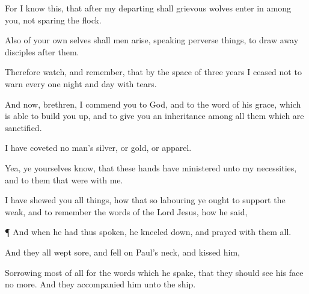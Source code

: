 {For
I
know
this,
that
after
my
departing shall
grievous
wolves
enter in
among
you,
not
sparing the
flock.

Also
of
your own
selves
shall
men
arise,
speaking perverse
things, to draw
away
disciples
after
them.

Therefore
watch, and
remember,
that by the space of three
years I
ceased
not to
warn
every
one
night
and
day
with
tears.

And
now,
brethren, I
commend
you to
God,
and to the
word of
his
grace, which is
able to build you
up,
and to
give
you an
inheritance
among
all them
which are
sanctified.

I have
coveted no
man’s
silver,
or
gold,
or
apparel.

Yea,
ye
yourselves
know,
that
these
hands have
ministered unto
my
necessities,
and to
them that
were
with
me.

I have
shewed
you all
things, how
that
so
labouring ye
ought to
support the
weak,
and to
remember the
words of the
Lord
Jesus,
how
he
said,
{}


\par }{\PP {}¶
And when he
had
thus
spoken, he kneeled
down, and
prayed
with
them
all.

And
they
all
wept
sore,
and
fell
on
Paul’s
neck, and
kissed
him,

Sorrowing most of
all
for the
words
which he
spake,
that they
should
see
his
face no
more.
And they
accompanied
him
unto the
ship.




\par }
